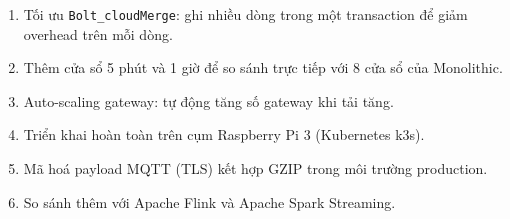 \documentclass[13pt,a4paper]{report}
\newcommand{\code}[1]{\texttt{\small #1}}
\begin{document}
\begin{enumerate}
  \item Tối ưu \code{Bolt\_cloudMerge}: ghi nhiều dòng trong một transaction để
        giảm overhead trên mỗi dòng.
  \item Thêm cửa sổ 5 phút và 1 giờ để so sánh trực tiếp với 8 cửa sổ của
        Monolithic.
  \item Auto-scaling gateway: tự động tăng số gateway khi tải tăng.
  \item Triển khai hoàn toàn trên cụm Raspberry Pi 3 (Kubernetes k3s).
  \item Mã hoá payload MQTT (TLS) kết hợp GZIP trong môi trường production.
  \item So sánh thêm với Apache Flink và Apache Spark Streaming.
\end{enumerate}
\end{document}
